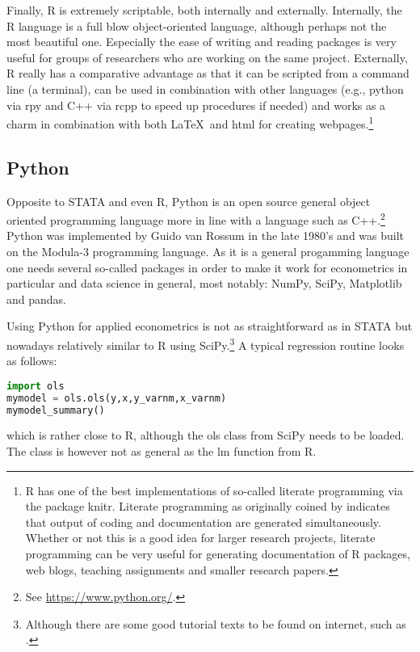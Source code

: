 \documentclass[fleqn,10pt]{SelfArx} %
\begin{document}
Finally, R is extremely scriptable, both internally and externally. Internally, the R language is a full blow object-oriented language, although perhaps not the most beautiful one. Especially the ease of writing and reading packages is very useful for groups of researchers who are working on the same project. Externally, R really has a comparative advantage as that it can be scripted from a command line (a terminal), can be used in combination with other languages (e.g., python via rpy and C++ via rcpp to speed up procedures if needed) and works as a charm in combination with both \LaTeX\ and html for creating webpages.\footnote{R has one of the best implementations of so-called literate programming via the package knitr. Literate programming as originally coined by \citet{knuth1984literate} indicates that output of coding and documentation are generated simultaneously. Whether or not this is a good idea for larger research projects, literate programming can be very useful for generating documentation of R packages, web blogs, teaching assignments and smaller research papers.}

\subsection*{Python}

Opposite to STATA and even R, Python is an open source general object oriented programming language more in line with a language such as C++.\footnote{See \href{https://www.python.org/}{https://www.python.org/}.} Python was implemented by Guido van Rossum in the late 1980's and was built on the Modula-3 programming language. As it is a general progamming language one needs several so-called packages in order to make it work for econometrics in particular and data science in general, most notably: NumPy, SciPy, Matplotlib and pandas.

Using Python for applied econometrics is not as straightforward as in STATA but nowadays relatively similar to R using SciPy.\footnote{Although there are some good tutorial texts to be found on internet, such as \citet{sargent2015quantitative}.} A typical regression routine looks as follows:
\begin{lstlisting}[language=python]
import ols
mymodel = ols.ols(y,x,y_varnm,x_varnm)
mymodel_summary()
\end{lstlisting}
which is rather close to R, although the ols class from SciPy needs to be loaded. The class is however not as general as the lm function from R. 
\end{document}
